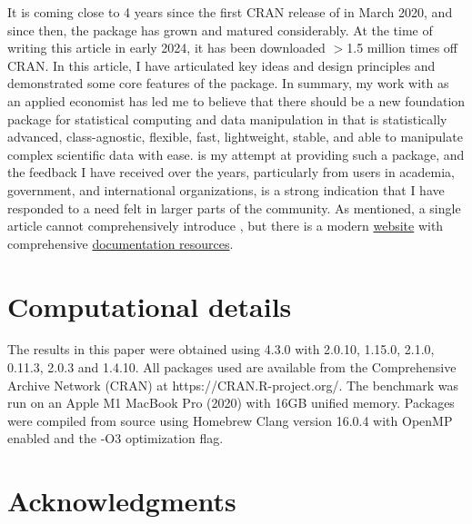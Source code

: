 \documentclass[nojss]{jss} %
\begin{document}
It is coming close to 4 years since the first CRAN release of  in March 2020, and since then, the package has grown and matured considerably. At the time of writing this article in early 2024, it has been downloaded $>$1.5 million times off CRAN. In this article, I have articulated key ideas and design principles and demonstrated some core features of the package. In summary, my work with  as an applied economist has led me to believe that there should be a new foundation package for statistical computing and data manipulation in  that is statistically advanced, class-agnostic, flexible, fast, lightweight, stable, and able to manipulate complex scientific data with ease.  is my attempt at providing such a package, and the feedback I have received over the years, particularly from users in academia, government, and international organizations, is a strong indication that I have responded to a need felt in larger parts of the  community. As mentioned, a single article cannot comprehensively introduce , but there is a modern \href{https://sebkrantz.github.io/collapse/index.html}{website} with comprehensive \href{https://sebkrantz.github.io/collapse/articles/collapse_documentation.html}{documentation resources}.



\section*{Computational details}
The results in this paper were obtained using  \citep{R} 4.3.0 with  2.0.10,  1.15.0,  2.1.0,  0.11.3,  \citep{rmagrittr} 2.0.3 and  \citep{rmicrobenchmark} 1.4.10. All packages used are available from the Comprehensive  Archive Network (CRAN) at https://CRAN.R-project.org/. The benchmark was run on an Apple M1 MacBook Pro (2020) with 16GB unified memory. Packages were compiled from source using Homebrew Clang version 16.0.4 with OpenMP enabled and the -O3 optimization flag.

\section*{Acknowledgments}
\end{document}
